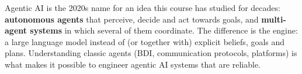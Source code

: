 \begin{nbwhy}
Agentic AI is the 2020s name for an idea this course has studied for decades:
\textbf{autonomous agents} that perceive, decide and act towards goals, and
\textbf{multi-agent systems} in which several of them coordinate. The difference is the
engine: a large language model instead of (or together with) explicit beliefs, goals and
plans. Understanding classic agents (BDI, communication protocols, platforms) is what makes
it possible to engineer agentic AI systems that are reliable.
\end{nbwhy}
